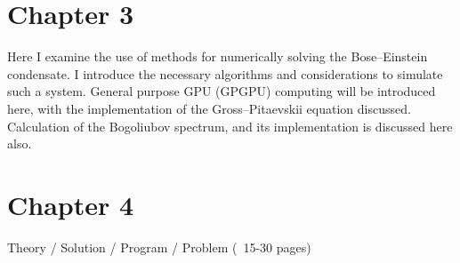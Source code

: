 \iffalse
Introduction (~5-10 pages)

    - Thesis Statement (one or two sentences)
        What is your thesis about and what have you done?
        If you have a hypothesis what is it?
        How will you test (prove/disprove) your hypothesis?
    - Motivation
        Why is this problem you've worked on important
    - Goals / Objectives
        What are you trying to do and why?
        How will you or the reader know if or when you've met your objectives?
    - **** Contributions *****
        What is new, different, better, significant?
        Why is the world a better place because of what you've done?
        What have you contributed to the field of research?
        What is now known/possible/better because of your thesis?
    Outline of the thesis (optional)
\fi

\section{Chapter 3}
    Here I examine the use of methods for numerically solving the Bose--Einstein condensate. I introduce the necessary algorithms and considerations to simulate such a system. General purpose GPU (GPGPU) computing will be introduced here, with the implementation of the Gross--Pitaevskii equation discussed. Calculation of the Bogoliubov spectrum, and its implementation is discussed here also.

\iffalse
Background / Related Work (~8-20 pages)
    More than a literature review
    Organize related work - impose structure
    Be clear as to how previous work being described relates to your own.
    The reader should not be left wondering why you've described something!!
    Critique the existing work - Where is it strong where is it weak? What are the unreasonable/undesirable assumptions?
    Identify opportunities for more research (i.e., your thesis) Are there unaddressed, or more important related topics?
    After reading this chapter, one should understand the motivation for and importance of your thesis
    You should clearly and precisely define all of the key concepts dealt with in the rest of the thesis, and teach the reader what s/he needs to know to understand the rest of the thesis.
\fi

\section{Chapter 4}
\iffalse
Theory / Solution / Program / Problem (~15-30 pages)

